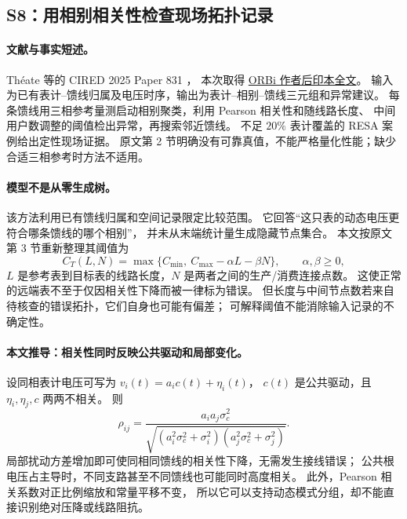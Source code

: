 \subsection{S8：用相别相关性检查现场拓扑记录}
\label{subsec:S8}

\paragraph{文献与事实短述。}
Théate 等的 CIRED 2025 Paper 831 \citep{S8}，
本次取得 \href{https://orbi.uliege.be/bitstream/2268/327542/1/831.pdf}{ORBi 作者后印本全文}。
输入为已有表计--馈线归属及电压时序，输出为表计--相别--馈线三元组和异常建议。
每条馈线用三相参考量测启动相别聚类，利用 Pearson 相关性和随线路长度、
中间用户数调整的阈值检出异常，再搜索邻近馈线。
不足 $20\%$ 表计覆盖的 RESA 案例给出定性现场证据。
原文第 2 节明确没有可靠真值，不能严格量化性能；缺少合适三相参考时方法不适用。

\paragraph{模型不是从零生成树。}
该方法利用已有馈线归属和空间记录限定比较范围。
它回答“这只表的动态电压更符合哪条馈线的哪个相别”，
并未从末端统计量生成隐藏节点集合。
本文按原文第 3 节重新整理其阈值为
\begin{equation}
 C_T(L,N)=\max\{C_{\min},\ C_{\max}-\alpha L-\beta N\},
 \qquad \alpha,\beta\geq0,
 \label{eq:eng-s8-threshold}
\end{equation}
$L$ 是参考表到目标表的线路长度，$N$ 是两者之间的生产/消费连接点数。
这使正常的远端表不至于仅因相关性下降而被一律标为错误。
但长度与中间节点数若来自待核查的错误拓扑，它们自身也可能有偏差；
可解释阈值不能消除输入记录的不确定性。

\paragraph{本文推导：相关性同时反映公共驱动和局部变化。}
设同相表计电压可写为 $v_i(t)=a_i c(t)+\eta_i(t)$，
$c(t)$ 是公共驱动，且 $\eta_i,\eta_j,c$ 两两不相关。
则
\begin{equation}
 \rho_{ij}=\frac{a_i a_j\sigma_c^2}
 {\sqrt{(a_i^2\sigma_c^2+\sigma_i^2)
              (a_j^2\sigma_c^2+\sigma_j^2)}}.
 \label{eq:eng-s8-correlation}
\end{equation}
局部扰动方差增加即可使同相同馈线的相关性下降，无需发生接线错误；
公共根电压占主导时，不同支路甚至不同馈线也可能同时高度相关。
此外，Pearson 相关系数对正比例缩放和常量平移不变，
所以它可以支持动态模式分组，却不能直接识别绝对压降或线路阻抗。

